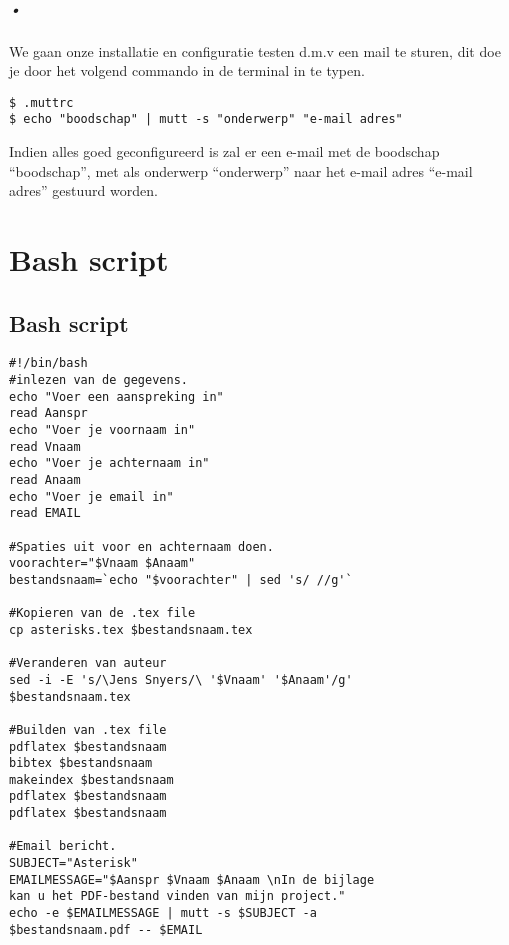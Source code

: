 \documentclass[12pt,a4paper]{report}
\begin{document}
\paragraph{•}
We gaan onze installatie en configuratie testen d.m.v een mail te sturen, dit doe je door het volgend commando in de terminal in te typen.
\begin{lstlisting}[frame=BTrl]
$ .muttrc
$ echo "boodschap" | mutt -s "onderwerp" "e-mail adres"
\end{lstlisting}
Indien alles goed geconfigureerd is zal er een e-mail met de boodschap ``boodschap'', met als onderwerp ``onderwerp'' naar het e-mail adres ``e-mail adres'' gestuurd worden.

\renewcommand\thechapter{C} %
\chapter{Bash script}
\section{Bash script}
\begin{lstlisting}[frame=BTrl]
#!/bin/bash
#inlezen van de gegevens.
echo "Voer een aanspreking in"
read Aanspr
echo "Voer je voornaam in"
read Vnaam
echo "Voer je achternaam in"
read Anaam
echo "Voer je email in"
read EMAIL

#Spaties uit voor en achternaam doen.
voorachter="$Vnaam $Anaam"
bestandsnaam=`echo "$voorachter" | sed 's/ //g'`

#Kopieren van de .tex file
cp asterisks.tex $bestandsnaam.tex

#Veranderen van auteur
sed -i -E 's/\Jens Snyers/\ '$Vnaam' '$Anaam'/g' 
$bestandsnaam.tex

#Builden van .tex file
pdflatex $bestandsnaam
bibtex $bestandsnaam
makeindex $bestandsnaam
pdflatex $bestandsnaam
pdflatex $bestandsnaam

#Email bericht.
SUBJECT="Asterisk"
EMAILMESSAGE="$Aanspr $Vnaam $Anaam \nIn de bijlage 
kan u het PDF-bestand vinden van mijn project."
echo -e $EMAILMESSAGE | mutt -s $SUBJECT -a 
$bestandsnaam.pdf -- $EMAIL
\end{lstlisting}

\listoffigures

\listoftables

\printindex



\nocite{LaTeX,LaTeX2,Appendix}
\end{document}
